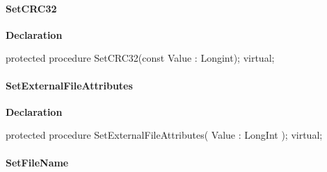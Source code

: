 \documentclass{report}
\newif\ifpdf
\begin{document}
\paragraph*{SetCRC32}\hspace*{\fill}

\label{AbArcTyp.TAbArchiveItem-SetCRC32}
\begin{list}{}{
\setlength{\itemindent}{0cm}
\setlength{\listparindent}{0cm}
\setlength{\leftmargin}{\evensidemargin}
\addtolength{\leftmargin}{\tmplength}
\settowidth{\labelsep}{X}
\addtolength{\leftmargin}{\labelsep}
\setlength{\labelwidth}{\tmplength}
}
\item[\textbf{Declaration}\hfill]
\ifpdf
\begin{flushleft}
\fi
\begin{ttfamily}
protected procedure SetCRC32(const Value : Longint); virtual;\end{ttfamily}

\ifpdf
\end{flushleft}
\fi

\end{list}
\paragraph*{SetExternalFileAttributes}\hspace*{\fill}

\label{AbArcTyp.TAbArchiveItem-SetExternalFileAttributes}
\begin{list}{}{
\setlength{\itemindent}{0cm}
\setlength{\listparindent}{0cm}
\setlength{\leftmargin}{\evensidemargin}
\addtolength{\leftmargin}{\tmplength}
\settowidth{\labelsep}{X}
\addtolength{\leftmargin}{\labelsep}
\setlength{\labelwidth}{\tmplength}
}
\item[\textbf{Declaration}\hfill]
\ifpdf
\begin{flushleft}
\fi
\begin{ttfamily}
protected procedure SetExternalFileAttributes( Value : LongInt ); virtual;\end{ttfamily}

\ifpdf
\end{flushleft}
\fi

\end{list}
\paragraph*{SetFileName}\hspace*{\fill}
\end{document}
